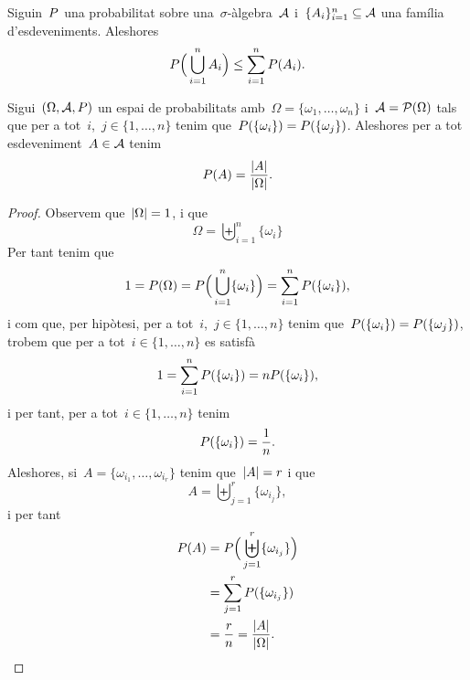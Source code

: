 \documentclass[../Apunts.tex]{subfiles}
\begin{document}
	\begin{corollary}
		\label{cor:subadditivitat finita}
		Siguin~\(P\) una probabilitat sobre una~\(\sigma\)-àlgebra~\(\mathcal{A}\) i~\(\{A_{i}\}_{i=1}^{n}\subseteq\mathcal{A}\) una família d'esdeveniments. Aleshores
		\[P\Big(\bigcup_{i=1}^{n}A_{i}\Big)\leq\sum_{i=1}^{n}P(A_{i}).\]
	\end{corollary}
	\begin{theorem}
		\label{thm:definició de Laplace}
		Sigui~\((\Omega,\mathcal{A},P)\) un espai de probabilitats amb~\(\Omega=\{\omega_{1},\dots,\omega_{n}\}\) i~\(\mathcal{A}=\operatorname{\mathcal{P}}(\Omega)\) tals que per a tot~\(i\),~\(j\in\{1,\dots,n\}\) tenim que~\(P(\{\omega_{i}\})=P(\{\omega_{j}\})\). Aleshores per a tot esdeveniment~\(A\in\mathcal{A}\) tenim
		\[\Probabilitat(A)=\frac{\abs{A}}{\abs{\Omega}}.\]
		\begin{proof}
			Observem que~\(\abs{\Omega}=1\), i que
			\[\Omega=\biguplus_{i=1}^{n}\{\omega_{i}\}\]
			Per tant tenim que
			\[1=P(\Omega)=P\Big(\bigcup_{i=1}^{n}\{\omega_{i}\}\Big)=\sum_{i=1}^{n}P(\{\omega_{i}\}),\]
			i com que, per hipòtesi, per a tot~\(i\),~\(j\in\{1,\dots,n\}\) tenim que~\(P(\{\omega_{i}\})=P(\{\omega_{j}\})\), trobem que per a tot~\(i\in\{1,\dots,n\}\) es satisfà
			\[1=\sum_{i=1}^{n}P(\{\omega_{i}\})=nP(\{\omega_{i}\}),\]
			i per tant, per a tot~\(i\in\{1,\dots,n\}\) tenim
			\[P(\{\omega_{i}\})=\frac{1}{n}.\]
			Aleshores, si~\(A=\{\omega_{i_{1}},\dots,\omega_{i_{r}}\}\) tenim que~\(\abs{A}=r\) i que
			\[A=\biguplus_{j=1}^{r}\{\omega_{i_{j}}\},\]
			i per tant
			\begin{align*}
				\Probabilitat(A)&=\Probabilitat\Big(\biguplus_{j=1}^{r}\{\omega_{i_{j}}\}\Big) \\
				&=\sum_{j=1}^{r}\Probabilitat(\{\omega_{i_{j}}\}) \\
				&=\frac{r}{n}=\frac{\abs{A}}{\abs{\Omega}}.\qedhere
			\end{align*}
		\end{proof}
	\end{theorem}
\end{document}
